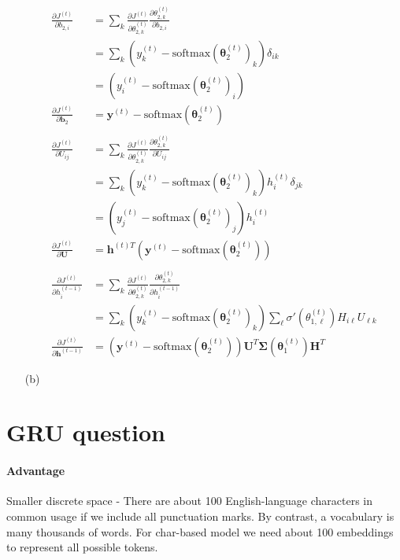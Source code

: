 \documentclass{article}
\begin{document}
\begin{itemize}
    \begin{align*}
        \frac{\partial J^{(t)}}{\partial b_{2, i}} &= \sum_k \frac{\partial J^{(t)}}{\partial \theta_{2, k}^{(t)}} \frac{\partial \theta_{2, k}^{(t)}}{\partial b_{2,i}}\\
        &= \sum_k (y_k^{(t)} - \text{softmax}(\boldsymbol{\theta}_2^{(t)})_k) \delta_{ik}\\
        &= (y_i^{(t)} - \text{softmax}(\boldsymbol{\theta}_2^{(t)})_i)\\
        \frac{\partial J^{(t)}}{\partial \mathbf{b}_2} &= \mathbf{y}^{(t)} - \text{softmax}(\boldsymbol{\theta}_2^{(t)})\\
        \\
        \frac{\partial J^{(t)}}{\partial U_{ij}} &= \sum_k \frac{\partial J^{(t)}}{\partial \theta_{2, k}^{(t)}} \frac{\partial \theta_{2, k}^{(t)}}{\partial U_{ij}}\\
        &= \sum_k (y_k^{(t)} - \text{softmax}(\boldsymbol{\theta}_2^{(t)})_k) h_i^{(t)}\delta_{jk}\\
        &= (y_j^{(t)} - \text{softmax}(\boldsymbol{\theta}_2^{(t)})_j) h_i^{(t)} \\
        \frac{\partial J^{(t)}}{\partial \mathbf{U}} &= \mathbf{h}^{(t)T} (\mathbf{y}^{(t)} - \text{softmax}(\boldsymbol{\theta}_2^{(t)}))\\
        \\
        \frac{\partial J^{(t)}}{\partial h_i^{(t-1)}} &= \sum_k \frac{\partial J^{(t)}}{\partial \theta_{2, k}^{(t)}} \frac{\partial \theta_{2, k}^{(t)}}{\partial h_i^{(t-1)}}\\
        &= \sum_k (y_k^{(t)} - \text{softmax}(\boldsymbol{\theta}_2^{(t)})_k) \sum_\ell \sigma'(\theta_{1, \ell}^{(t)}) H_{i\ell} U_{\ell k}\\
        \frac{\partial J^{(t)}}{\partial \mathbf{h}^{(t-1)}} &= (\mathbf{y}^{(t)}-\text{softmax}(\boldsymbol{\theta}_2^{(t)})) \mathbf{U}^T \boldsymbol{\Sigma}(\boldsymbol{\theta}_1^{(t)})\mathbf{H}^T
    \end{align*}
    
    \item[(b)]
\end{itemize}

\section{GRU question}
\paragraph{Advantage}
Smaller discrete space - There are about 100 English-language characters in common usage if we include all punctuation marks. By contrast, a vocabulary is many thousands of words. For char-based model we need about 100 embeddings to represent all possible tokens.
\end{document}
